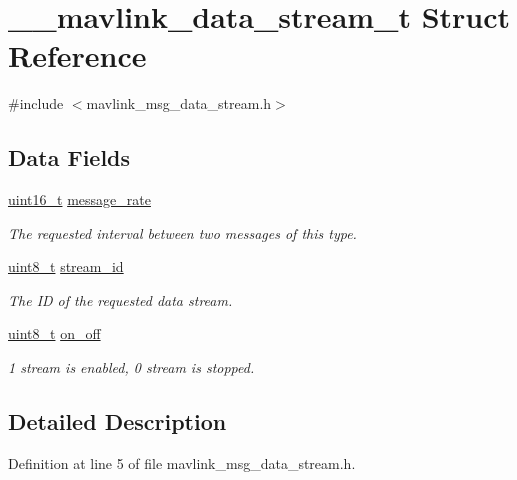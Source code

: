 \hypertarget{struct____mavlink__data__stream__t}{\section{\-\_\-\-\_\-mavlink\-\_\-data\-\_\-stream\-\_\-t Struct Reference}
\label{struct____mavlink__data__stream__t}
}


{\ttfamily \#include $<$mavlink\-\_\-msg\-\_\-data\-\_\-stream.\-h$>$}

\subsection*{Data Fields}
\begin{DoxyCompactItemize}
\item 
\hyperlink{stdint_8h_a273cf69d639a59973b6019625df33e30}{uint16\-\_\-t} \hyperlink{struct____mavlink__data__stream__t_a351a00b81ef679d4fa73048257494bbc}{message\-\_\-rate}
\begin{DoxyCompactList}\small\item\em The requested interval between two messages of this type. \end{DoxyCompactList}\item 
\hyperlink{stdint_8h_aba7bc1797add20fe3efdf37ced1182c5}{uint8\-\_\-t} \hyperlink{struct____mavlink__data__stream__t_aaac4584f5e5677fe70edee1c53565b53}{stream\-\_\-id}
\begin{DoxyCompactList}\small\item\em The I\-D of the requested data stream. \end{DoxyCompactList}\item 
\hyperlink{stdint_8h_aba7bc1797add20fe3efdf37ced1182c5}{uint8\-\_\-t} \hyperlink{struct____mavlink__data__stream__t_ae0ec7bd3a3fd38496e2a6aaa3b39daca}{on\-\_\-off}
\begin{DoxyCompactList}\small\item\em 1 stream is enabled, 0 stream is stopped. \end{DoxyCompactList}\end{DoxyCompactItemize}


\subsection{Detailed Description}


Definition at line 5 of file mavlink\-\_\-msg\-\_\-data\-\_\-stream.\-h.



